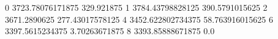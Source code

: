 0 3723.78076171875 329.921875
1 3784.43798828125 390.5791015625
2 3671.2890625 277.43017578125
4 3452.622802734375 58.763916015625
6 3397.5615234375 3.70263671875
8 3393.85888671875 0.0
